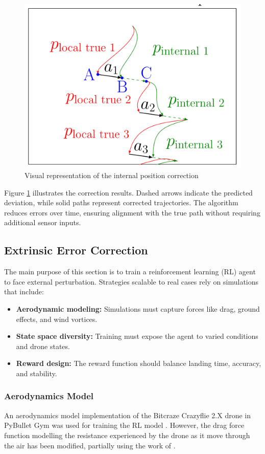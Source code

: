 \documentclass[10pt,journal,compsoc]{IEEEtran}
\begin{document}
\begin{figure}[H]
    \centering
    \includegraphics[width=0.4\linewidth]{rsc/trajectory_alg1.png}
    \caption{Visual representation of the internal position correction}
    \label{fig:trajectory_correction}
\end{figure}

Figure \ref{fig:trajectory_correction} illustrates the correction results. Dashed arrows indicate the predicted deviation, while solid paths represent corrected trajectories. The algorithm reduces errors over time, ensuring alignment with the true path without requiring additional sensor inputs.


\subsection{Extrinsic Error Correction}
The main purpose of this section is to train a reinforcement learning (RL) agent to face external perturbation. Strategies scalable to real cases rely on simulations that include:

\begin{itemize}
    \item \textbf{Aerodynamic modeling:} Simulations must capture forces like drag, ground effects, and wind vortices.
    \item \textbf{State space diversity:} Training must expose the agent to varied conditions and drone states.
    \item \textbf{Reward design:} The reward function should balance landing time, accuracy, and stability.
\end{itemize}

\subsubsection{Aerodynamics Model}
An aerodynamics model implementation of the Bitcraze Crazyflie
2.X drone in PyBullet Gym was used for training the RL model \cite{studied}\cite{Panerati}. However, the drag force function modelling the resistance experienced by the drone as it move through the air has been modified, partially using the work of \cite{Forster}.
\end{document}
